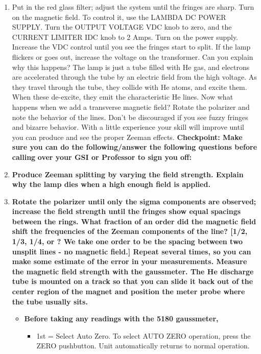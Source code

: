 \documentclass{../lab}
\begin{document}
\begin{enumerate}
    \item Put in the red glass filter; adjust the system until the fringes are sharp. Turn on the magnetic field. To control it, use the LAMBDA DC POWER SUPPLY. Turn the OUTPUT VOLTAGE VDC knob to zero, and the CURRENT LIMITER IDC knob to 2 Amps. Turn on the power supply. Increase the VDC control until you see the fringes start to split. If the lamp flickers or goes out, increase the voltage on the transformer. Can you explain why this happens? The lamp is just a tube filled with He gas, and electrons are accelerated through the tube by an electric field from the high voltage. As they travel through the tube, they collide with He atoms, and excite them. When these de-excite, they emit the characteristic He lines. Now what happens when we add a transverse magnetic field? Rotate the polarizer and note the behavior of the lines. Don't be discouraged if you see fuzzy fringes and bizarre behavior. With a little experience your skill will improve until you can produce and see the proper Zeeman effects.
    \textbf{Checkpoint: Make sure you can do the following/answer the following questions before calling }\textbf{over your GSI or Professor to sign you off:}

    \item \textbf{Produce Zeeman splitting by varying the field strength. Explain why the lamp dies when a high enough field is applied. }

    \item \textbf{Rotate the polarizer until only the sigma components are observed; increase the field strength until the fringes show equal spacings between the rings. What fraction of an order did the magnetic field shift the frequencies of the Zeeman components of the line? [1/2, 1/3, 1/4, or ? We take one order to be the spacing between two unsplit lines - no magnetic field.] Repeat several times, so you can make some estimate of the error in your measurements. Measure the magnetic field strength with the gaussmeter. The He discharge tube is mounted on a track so that you can slide it back out of the center region of the magnet and position the meter probe where the tube usually sits.}

    \begin{itemize}
        \item \textbf{Before taking any readings with the 5180 gaussmeter,}
        \begin{itemize}
            \item 1st = Select Auto Zero. To select AUTO ZERO operation, press the ZERO pushbutton. Unit automatically returns to normal operation.
        

\end{itemize}
\end{itemize}
\end{enumerate}
\end{document}
